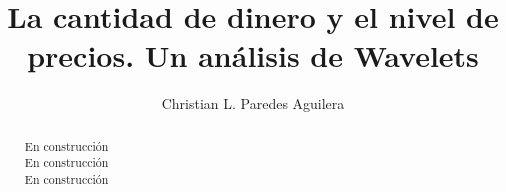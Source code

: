 \documentclass[a4paper,fleqn]{cas-sc}
\begin{document}
\let\WriteBookmarks\relax
\def\floatpagepagefraction{1}
\def\textpagefraction{.001}

\shorttitle{}    


\title[mode = title]{La cantidad de dinero y el nivel de precios. Un análisis de Wavelets}  

\tnotemark[1]



\author[1]{Christian L. Paredes Aguilera}%









\begin{abstract}
En construcción\\
En construcción\\
En construcción\\
\end{abstract}


\end{document}
